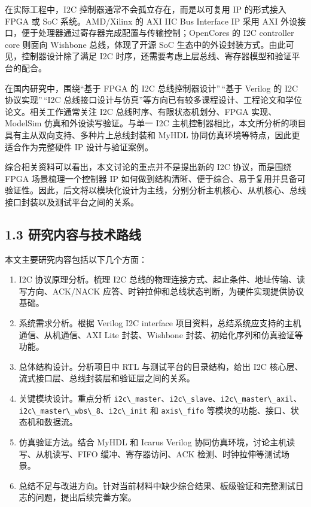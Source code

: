在实际工程中，I2C 控制器通常不会孤立存在，而是以可复用 IP 的形式接入
FPGA 或 SoC 系统。AMD/Xilinx 的 AXI IIC Bus Interface IP 采用 AXI
外设接口，便于处理器通过寄存器完成配置与传输控制；OpenCores 的 I2C
controller core 则面向 Wishbone 总线，体现了开源 SoC
生态中的外设封装方式。由此可见，控制器设计除了满足 I2C
时序，还需要考虑上层总线、寄存器模型和验证平台的配合。

在国内研究中，围绕``基于 FPGA 的 I2C 总线控制器设计''\,``基于 Verilog 的
I2C 协议实现''\,``I2C
总线接口设计与仿真''等方向已有较多课程设计、工程论文和学位论文。相关工作通常关注
I2C 总线时序、有限状态机划分、FPGA 实现、ModelSim
仿真和外设读写验证。与单一 I2C
主机控制器相比，本文所分析的项目具有主从双向支持、多种片上总线封装和
MyHDL 协同仿真环境等特点，因此更适合作为完整硬件 IP 设计与验证案例。

综合相关资料可以看出，本文讨论的重点并不是提出新的 I2C 协议，而是围绕
FPGA 场景梳理一个控制器 IP
如何做到结构清晰、便于综合、易于复用并具备可验证性。因此，后文将以模块化设计为主线，分别分析主机核心、从机核心、总线接口封装以及测试平台之间的关系。

\subsection{1.3
研究内容与技术路线}\label{ux7814ux7a76ux5185ux5bb9ux4e0eux6280ux672fux8defux7ebf}

本文主要研究内容包括以下几个方面：

\begin{enumerate}
\def\labelenumi{\arabic{enumi}.}
\tightlist
\item
  I2C 协议原理分析。梳理 I2C
  总线的物理连接方式、起止条件、地址传输、读写方向、ACK/NACK
  应答、时钟拉伸和总线状态判断，为硬件实现提供协议基础。
\item
  系统需求分析。根据 Verilog I2C interface
  项目资料，总结系统应支持的主机通信、从机通信、AXI Lite 封装、Wishbone
  封装、初始化序列和仿真验证等功能。
\item
  总体结构设计。分析项目中 RTL 与测试平台的目录结构，给出 I2C
  核心层、流式接口层、总线封装层和验证层之间的关系。
\item
  关键模块设计。重点分析
  \passthrough{\lstinline!i2c\_master!}、\passthrough{\lstinline!i2c\_slave!}、\passthrough{\lstinline!i2c\_master\_axil!}、\passthrough{\lstinline!i2c\_master\_wbs\_8!}、\passthrough{\lstinline!i2c\_init!}
  和 \passthrough{\lstinline!axis\_fifo!}
  等模块的功能、接口、状态机和数据流。
\item
  仿真验证方法。结合 MyHDL 和 Icarus Verilog
  协同仿真环境，讨论主机读写、从机读写、FIFO 缓冲、寄存器访问、ACK
  检测、时钟拉伸等测试场景。
\item
  总结不足与改进方向。针对当前材料中缺少综合结果、板级验证和完整测试日志的问题，提出后续完善方案。
\end{enumerate}

